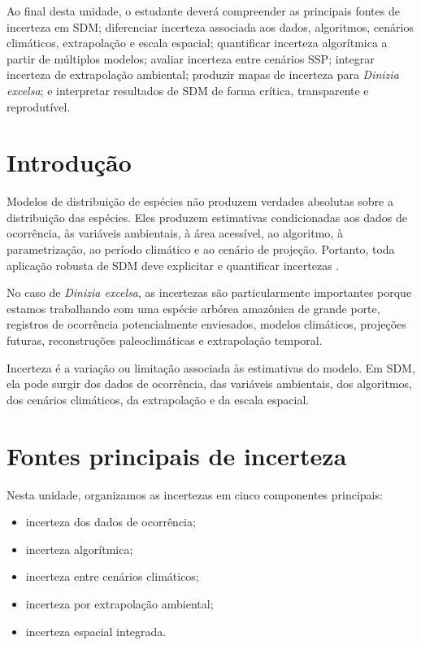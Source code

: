 \documentclass{ueap-sdm}
\begin{document}
\begin{objetivos}
	Ao final desta unidade, o estudante deverá compreender as principais fontes de incerteza em SDM; diferenciar incerteza associada aos dados, algoritmos, cenários climáticos, extrapolação e escala espacial; quantificar incerteza algorítmica a partir de múltiplos modelos; avaliar incerteza entre cenários SSP; integrar incerteza de extrapolação ambiental; produzir mapas de incerteza para \textit{Dinizia excelsa}; e interpretar resultados de SDM de forma crítica, transparente e reprodutível.
\end{objetivos}

\section{Introdução}

Modelos de distribuição de espécies não produzem verdades absolutas sobre a distribuição das espécies. Eles produzem estimativas condicionadas aos dados de ocorrência, às variáveis ambientais, à área acessível, ao algoritmo, à parametrização, ao período climático e ao cenário de projeção. Portanto, toda aplicação robusta de SDM deve explicitar e quantificar incertezas \parencite{guisan2017habitat,franklin2023,zurell2020benchmarking,yates2018transferability}.

No caso de \textit{Dinizia excelsa}, as incertezas são particularmente importantes porque estamos trabalhando com uma espécie arbórea amazônica de grande porte, registros de ocorrência potencialmente enviesados, modelos climáticos, projeções futuras, reconstruções paleoclimáticas e extrapolação temporal.

\begin{conceito}[title={\faBook\quad Incerteza em SDM}]
	Incerteza é a variação ou limitação associada às estimativas do modelo. Em SDM, ela pode surgir dos dados de ocorrência, das variáveis ambientais, dos algoritmos, dos cenários climáticos, da extrapolação e da escala espacial.
\end{conceito}

\section{Fontes principais de incerteza}

Nesta unidade, organizamos as incertezas em cinco componentes principais:

\begin{itemize}
	\item incerteza dos dados de ocorrência;
	\item incerteza algorítmica;
	\item incerteza entre cenários climáticos;
	\item incerteza por extrapolação ambiental;
	\item incerteza espacial integrada.
\end{itemize}
\end{document}
